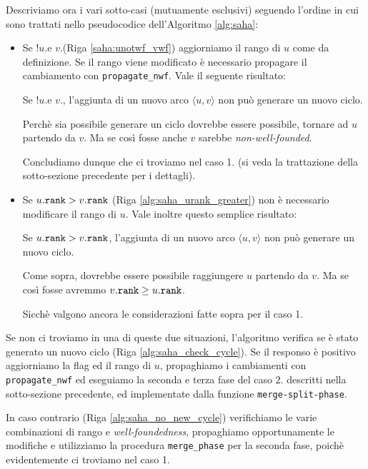 Descriviamo ora i vari sotto-casi (mutuamente esclusivi) seguendo l'ordine in cui sono trattati nello pseudocodice dell'Algoritmo \ref{alg:saha}:
\begin{itemize}
    \item Se !$u$.\wf e $v$.\wf (Riga \ref{saha:unotwf_vwf}) aggiorniamo il rango di $u$ come da definizione. Se il rango viene modificato è necessario propagare il cambiamento con \texttt{propagate\_nwf}. Vale il seguente risultato:
    \begin{observation}
        Se !$u$.\wf e $v$.\wf, l'aggiunta di un nuovo arco $\langle u,v \rangle$ non può generare un nuovo ciclo.
    \end{observation}
    \begin{proof2}
        Perchè sia possibile generare un ciclo dovrebbe essere possibile, tornare ad $u$ partendo da $v$. Ma se così fosse anche $v$ sarebbe \emph{non-well-founded}.
    \end{proof2}
    Concludiamo dunque che ci troviamo nel caso 1. (si veda la trattazione della sotto-sezione precedente per i dettagli).
    \item Se $u.\texttt{\textup{rank}} > v.\texttt{\textup{rank}}$ (Riga \ref{alg:saha_urank_greater}) non è necessario modificare il rango di $u$. Vale inoltre questo semplice risultato:
    \begin{observation}
        Se $u.\texttt{\textup{rank}} > v.\texttt{\textup{rank}}$, l'aggiunta di un nuovo arco $\langle u,v \rangle$ non può generare un nuovo ciclo.
    \end{observation}
    \begin{proof2}
        Come sopra, dovrebbe essere possibile raggiungere $u$ partendo da $v$. Ma se così fosse avremmo $v.\texttt{\textup{rank}} \geq u.\texttt{\textup{rank}}$.
    \end{proof2}
    Sicchè valgono ancora le considerazioni fatte sopra per il caso 1.
\end{itemize}
Se non ci troviamo in una di queste due situazioni, l'algoritmo verifica se è stato generato un nuovo ciclo (Riga \ref{alg:saha_check_cycle}). Se il responso è positivo aggiorniamo la flag \wf ed il rango di $u$, propaghiamo i cambiamenti con \texttt{propagate\_nwf} ed eseguiamo la seconda e terza fase del caso 2. descritti nella sotto-sezione precedente, ed implementate dalla funzione \texttt{merge-split-phase}.

In caso contrario (Riga \ref{alg:saha_no_new_cycle}) verifichiamo le varie combinazioni di rango e \emph{well-foundedness}, propaghiamo opportunamente le modifiche e utilizziamo la procedura \texttt{merge\_phase} per la seconda fase, poichè evidentemente ci troviamo nel caso 1.

